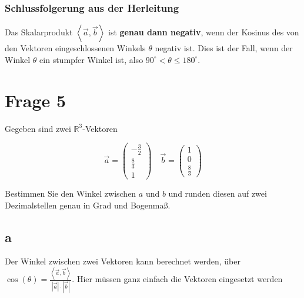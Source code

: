 \subsubsection*{Schlussfolgerung aus der Herleitung}
Das Skalarprodukt $\left\langle \vec{a}, \vec{b} \right\rangle$ ist \textbf{genau dann negativ}, wenn der
Kosinus des von den Vektoren eingeschlossenen Winkels $\theta$ negativ ist. Dies ist der Fall, wenn der
Winkel $\theta$ ein stumpfer Winkel ist, also $90^\circ < \theta \le 180^\circ$.

\section{Frage 5}

Gegeben sind zwei $\mathbb{R}^3$-Vektoren

\[
    \vec{a} = \begin{pmatrix}
        -\frac{3}{2} \\
        \frac{8}{3}  \\
        1
    \end{pmatrix} \quad \vec{b} = \begin{pmatrix}
        1 \\ 0 \\ \frac{8}{3}
    \end{pmatrix}
\]

Bestimmen Sie den Winkel zwischen $a$ und $b$ und runden diesen auf zwei
Dezimalstellen genau in Grad und Bogenmaß.

\subsection{a}

Der Winkel zwischen zwei Vektoren kann berechnet werden, über $\cos(\theta) =
    \frac{\left\langle \vec{a}, \vec{b} \right\rangle}{\left|\vec{a}\right| \cdot
        \left|\vec{b}\right|}$. Hier müssen ganz einfach die Vektoren eingesetzt werden

